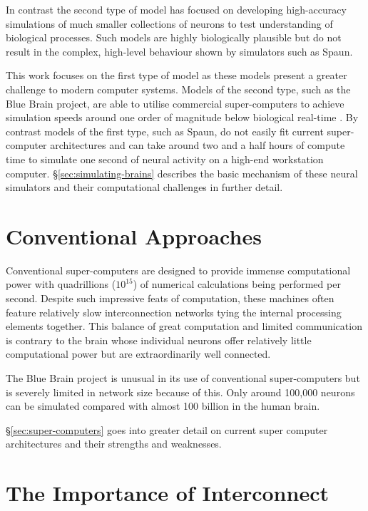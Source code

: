 		In contrast the second type of model has focused on developing
		high-accuracy simulations of much smaller collections of neurons to test
		understanding of biological processes. Such models are highly biologically
		plausible but do not result in the complex, high-level behaviour shown by
		simulators such as Spaun.
		
		This work focuses on the first type of model as these models present a
		greater challenge to modern computer systems. Models of the second type,
		such as the Blue Brain project, are able to utilise commercial
		super-computers to achieve simulation speeds around one order of magnitude
		below biological real-time \cite{markram06}. By contrast models of the first
		type, such as Spaun, do not easily fit current super-computer architectures
		and can take around two and a half hours of compute time to simulate one
		second of neural activity on a high-end workstation computer.
		\S\ref{sec:simulating-brains} describes the basic mechanism of these neural
		simulators and their computational challenges in further detail.
	
	\section{Conventional Approaches}
	
		Conventional super-computers are designed to provide immense computational
		power with quadrillions ($10^{15}$) of numerical calculations being
		performed per second. Despite such impressive feats of computation, these
		machines often feature relatively slow interconnection networks tying the
		internal processing elements together. This balance of great computation and
		limited communication is contrary to the brain whose individual neurons
		offer relatively little computational power but are extraordinarily well
		connected.
		
		The Blue Brain project is unusual in its use of conventional super-computers
		but is severely limited in network size because of this.  Only around
		100,000 neurons can be simulated compared with almost 100 billion in the
		human brain.
		
		\S\ref{sec:super-computers} goes into greater detail on current super
		computer architectures and their strengths and weaknesses.
	
	\section{The Importance of Interconnect}
		
